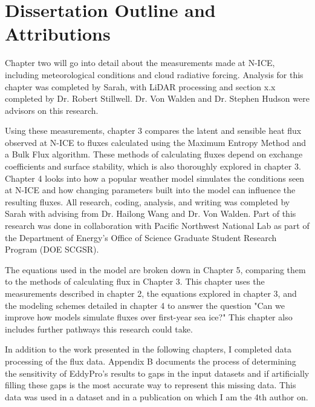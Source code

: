 \section{Dissertation Outline and Attributions}
Chapter two will go into detail about the measurements made at N-ICE, including meteorological conditions and cloud radiative forcing. Analysis for this chapter was completed by Sarah, with LiDAR processing and section x.x completed by Dr. Robert Stillwell. Dr. Von Walden and Dr. Stephen Hudson were advisors on this research. 

Using these measurements, chapter 3 compares the latent and sensible heat flux observed at N-ICE to fluxes calculated using the Maximum Entropy Method and a Bulk Flux algorithm. These methods of calculating fluxes depend on exchange coefficients and surface stability, which is also thoroughly explored in chapter 3. Chapter 4 looks into how a popular weather model simulates the conditions seen at N-ICE and how changing parameters built into the model can influence the resulting fluxes. All research, coding, analysis, and writing was completed by Sarah with advising from Dr. Hailong Wang and Dr. Von Walden. Part of this research was done in collaboration with Pacific Northwest National Lab as part of the Department of Energy's Office of Science Graduate Student Research Program (DOE SCGSR).

The equations used in the model are broken down in Chapter 5, comparing them to the methods of calculating flux in Chapter 3. This chapter uses the measurements described in chapter 2, the equations explored in chapter 3, and the modeling schemes detailed in chapter 4 to answer the question "Can we improve how models simulate fluxes over first-year sea ice?" This chapter also includes further pathways this research could take.

In addition to the work presented in the following chapters, I completed data processing of the flux data. Appendix B documents the process of determining the sensitivity of EddyPro's results to gaps in the input datasets and if artificially filling these gaps is the most accurate way to represent this missing data. This data was used in a dataset \cite{} and in a publication \cite{walden:2017} on which I am the 4th author on.


